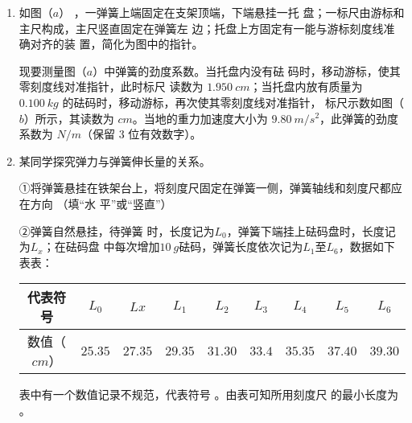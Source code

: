 \begin{enumerate}
\begin{enumerate}
\end{enumerate}

\begin{figure}[h!]
\centering
 \qquad 
 
\end{figure}


\newpage
\item 
{}
如图（$ a $）
，一弹簧上端固定在支架顶端，下端悬挂一托
盘；一标尺由游标和主尺构成，主尺竖直固定在弹簧左
边；托盘上方固定有一能与游标刻度线准确对齐的装
置，简化为图中的指针。

现要测量图（$ a $）中弹簧的劲度系数。当托盘内没有砝
码时，移动游标，使其零刻度线对准指针，此时标尺
读数为 $ 1.950 \ cm $；当托盘内放有质量为 $ 0.100 \ kg $ 的砝码时，移动游标，再次使其零刻度线对准指针，
标尺示数如图（$ b $）所示，其读数为
$ cm $。当地的重力加速度大小为 $ 9.80 \ m/s^{2} $，此弹簧的劲度
系数为
$ N/m $（保留 $ 3 $ 位有效数字）。
\begin{figure}[h!]
\centering

\end{figure}




\newpage
\item
{}
某同学探究弹力与弹簧伸长量的关系。

①将弹簧悬挂在铁架台上，将刻度尺固定在弹簧一侧，弹簧轴线和刻度尺都应在方向  （填“水
平”或“竖直”）

②弹簧自然悬挂，待弹簧  时，长度记为$ L_{0} $，弹簧下端挂上砝码盘时，长度记为$ L_x $；在砝码盘
中每次增加$ 10 \ g $砝码，弹簧长度依次记为$ L_{1} $至$ L_{6} $，数据如下表表：
\begin{table}[h!]
\centering 
\begin{tabular}{|c|c|c|c|c|c|c|c|c|}
\hline 
代表符号 & $ L_{0} $ & $ Lx $ & $ L_{1} $ & $ L_{2} $ & $ L_{3} $ & $ L_{4} $ & $ L_{5} $ & $ L_{6} $
 \\
\hline
数值（$ cm $） & $ 25.35 $ & $ 27.35 $ & $ 29.35 $ & $ 31.30 $ & $ 33.4 $ & $ 35.35 $ & $ 37.40 $ & $ 39.30 $\\ 
\hline 
\end{tabular}
\end{table} 



表中有一个数值记录不规范，代表符号  。由表可知所用刻度尺
的最小长度为 。


\end{enumerate}
